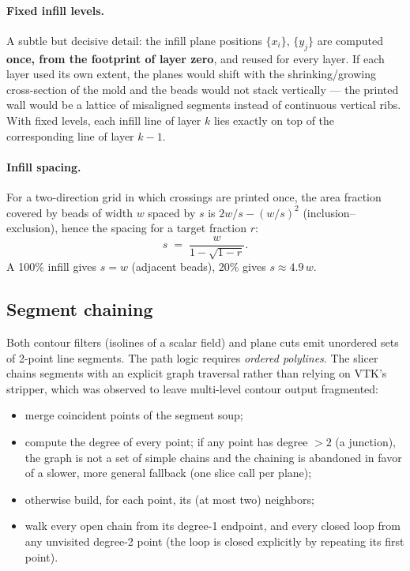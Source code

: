 \paragraph{Fixed infill levels.}
A subtle but decisive detail: the infill plane positions
$\{x_i\}$, $\{y_j\}$ are computed \textbf{once, from the footprint of
layer zero}, and reused for every layer. If each layer used its own
extent, the planes would shift with the shrinking/growing cross-section
of the mold and the beads would not stack vertically --- the printed
wall would be a lattice of misaligned segments instead of continuous
vertical ribs. With fixed levels, each infill line of layer $k$ lies
exactly on top of the corresponding line of layer $k-1$.

\paragraph{Infill spacing.}
For a two-direction grid in which crossings are printed once, the
area fraction covered by beads of width $w$ spaced by $s$ is
$2w/s - (w/s)^2$ (inclusion--exclusion), hence the spacing for a target
fraction $r$:
\begin{equation}
  s \;=\; \frac{w}{1 - \sqrt{1 - r}}.
\end{equation}
A 100\% infill gives $s = w$ (adjacent beads), 20\% gives
$s \approx 4.9\,w$.

\subsection{Segment chaining}\label{sec:meth-chaining}

Both contour filters (isolines of a scalar field) and plane cuts emit
unordered sets of 2-point line segments. The path logic requires
\emph{ordered polylines}. The slicer chains segments with an explicit
graph traversal rather than relying on VTK's stripper, which was
observed to leave multi-level contour output fragmented:

\begin{itemize}
  \item merge coincident points of the segment soup;
  \item compute the degree of every point; if any point has degree
        $> 2$ (a junction), the graph is not a set of simple chains and
        the chaining is abandoned in favor of a slower, more general
        fallback (one slice call per plane);
  \item otherwise build, for each point, its (at most two) neighbors;
  \item walk every open chain from its degree-1 endpoint, and every
        closed loop from any unvisited degree-2 point (the loop is
        closed explicitly by repeating its first point).
\end{itemize}

